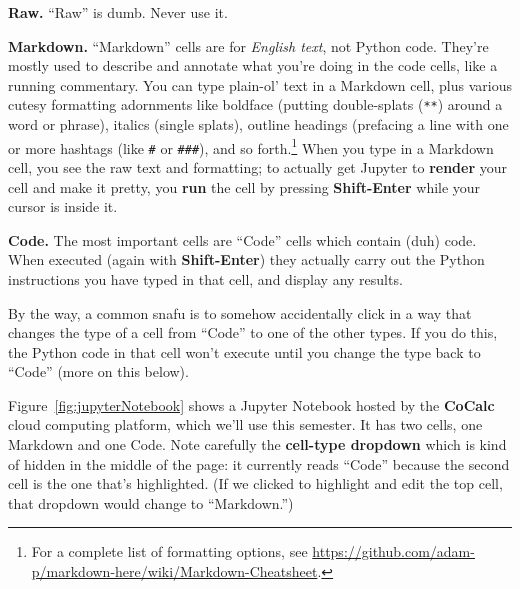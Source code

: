\begin{description}
\item{\textbf{Raw.}} ``Raw'' is dumb. Never use it.
\item{\textbf{Markdown.}} ``Markdown'' cells are for \textit{English text}, not Python
code. They're mostly used to describe and annotate what you're doing in the
code cells, like a running commentary. You can type plain-ol' text in a
Markdown cell, plus various cutesy formatting adornments like boldface (putting
double-splats (\texttt{**}) around a word or phrase), italics (single splats),
outline headings (prefacing a line with one or more hashtags (like \texttt{\#}
or \texttt{\#\#\#}), and so forth.\footnote{For a complete list of formatting
options, see
\url{https://github.com/adam-p/markdown-here/wiki/Markdown-Cheatsheet}.} When
you type in a Markdown cell, you see the raw text and formatting; to actually get Jupyter to
\textbf{render} your cell and make it pretty, you \textbf{run} the cell by
pressing \textbf{Shift-Enter} while your cursor is inside it.

\item{\textbf{Code.}} The most important cells are ``Code'' cells which contain (duh)
code. When executed (again with \textbf{Shift-Enter}) they actually carry out
the Python instructions you have typed in that cell, and display any results.

\end{description}

By the way, a common snafu is to somehow accidentally click in a way that
changes the type of a cell from ``Code'' to one of the other types. If you do
this, the Python code in that cell won't execute until you change the type back
to ``Code'' (more on this below).

Figure~\ref{fig:jupyterNotebook} shows a Jupyter Notebook hosted by the
\textbf{CoCalc} cloud computing platform, which we'll use this semester. It has
two cells, one Markdown and one Code. Note carefully the \textbf{cell-type
dropdown} which is kind of hidden in the middle of the page: it currently reads
``Code'' because the second cell is the one that's highlighted. (If we clicked
to highlight and edit the top cell, that dropdown would change to
``Markdown.'')

